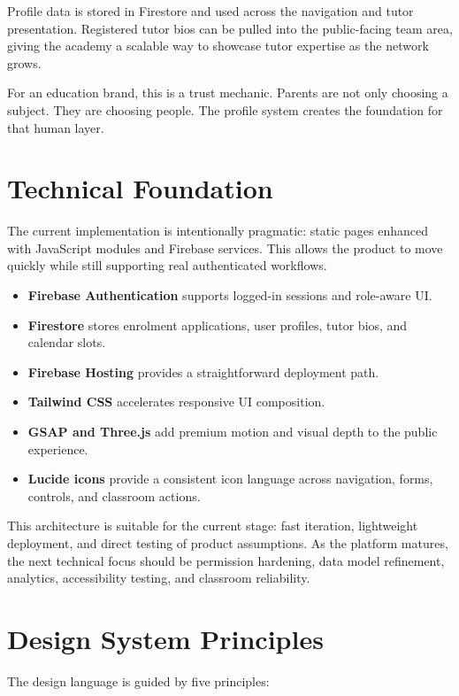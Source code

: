 \documentclass[11pt,a4paper]{article}
\begin{document}
Profile data is stored in Firestore and used across the navigation and tutor presentation. Registered tutor bios can be pulled into the public-facing team area, giving the academy a scalable way to showcase tutor expertise as the network grows.

For an education brand, this is a trust mechanic. Parents are not only choosing a subject. They are choosing people. The profile system creates the foundation for that human layer.

\section{Technical Foundation}

The current implementation is intentionally pragmatic: static pages enhanced with JavaScript modules and Firebase services. This allows the product to move quickly while still supporting real authenticated workflows.

\begin{itemize}
    \item \textbf{Firebase Authentication} supports logged-in sessions and role-aware UI.
    \item \textbf{Firestore} stores enrolment applications, user profiles, tutor bios, and calendar slots.
    \item \textbf{Firebase Hosting} provides a straightforward deployment path.
    \item \textbf{Tailwind CSS} accelerates responsive UI composition.
    \item \textbf{GSAP and Three.js} add premium motion and visual depth to the public experience.
    \item \textbf{Lucide icons} provide a consistent icon language across navigation, forms, controls, and classroom actions.
\end{itemize}

This architecture is suitable for the current stage: fast iteration, lightweight deployment, and direct testing of product assumptions. As the platform matures, the next technical focus should be permission hardening, data model refinement, analytics, accessibility testing, and classroom reliability.

\section{Design System Principles}

The design language is guided by five principles:
\end{document}
